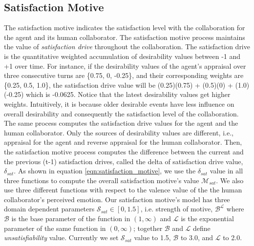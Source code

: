 \documentclass[12pt]{report}
\begin{document}
\subsection{Satisfaction Motive}
The satisfaction motive indicates the satisfaction level with the collaboration
for the agent and its human collaborator. The satisfaction motive process maintains
the value of \textit{satisfaction drive} throughout the collaboration. The
satisfaction drive is the quantitative weighted accumulation of desirability
values between -1 and +1 over time. For instance, if the desirability values of
the agent's appraisal over three consecutive turns are \{0.75, 0, -0.25\}, and
their corresponding weights are \{0.25, 0.5, 1.0\}, the satisfaction drive value
will be (0.25)(0.75) + (0.5)(0) + (1.0)(-0.25) which is -0.0625. Notice that
the latest desirability values get higher weights. Intuitively, it is because
older desirable events have less influence on overall desirability and
consequently the satisfaction level of the collaboration. The same process
computes the satisfaction drive values for the agent and the human collaborator.
Only the sources of desirability values are different, i.e., appraisal for the
agent and reverse appraisal for the human collaborator. Then, the satisfaction
motive process computes the difference between the current and the previous
(t-1) satisfaction drives, called the delta of satisfaction drive value,
$\delta_{sat}$. As shown in equation \ref{eqn:satisfaction_motive}, we use the
$\delta_{sat}$ value in all three functions to compute the overall satisfaction
motive's value $\mathcal{M}_{sat}$. We also use three different functions with
respect to the valence value of the the human collaborator's perceived emotion.
Our satisfaction motive's model has three domain dependent parameters
$\mathcal{S}_{sat} \in [0, 1.5]$, i.e. strength of motive,
$\mathcal{B}^\mathcal{L}$ where $\mathcal{B}$ is the base parameter of the
function in $(1,\infty)$ and $\mathcal{L}$ is the exponential parameter of the
same function in $(0, \infty)$; together $\mathcal{B}$ and $\mathcal{L}$ define
\textit{unsatisfiability} value. Currently we set $\mathcal{S}_{sat}$ value to
1.5, $\mathcal{B}$ to 3.0, and $\mathcal{L}$ to 2.0.
\end{document}
